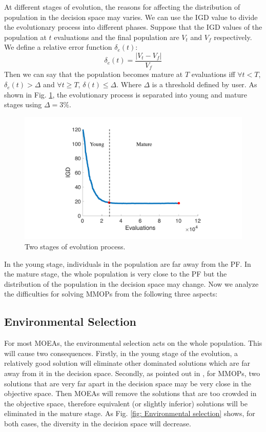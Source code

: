 \documentclass[conference]{IEEEtran}
\begin{document}
At different stages of evolution, the reasons for affecting the distribution of population in the decision space may varies. We can use the IGD\cite{IGD} value to divide the evolutionary process into different phases. Suppose that the IGD values of the population at $t$ evaluations and the final population are $V_t$ and $V_f$ respectively. We define a relative error function $\delta_e(t)$:
$$\delta_e(t)=\frac{|V_t-V_f|}{V_f}$$
Then we can say that the population becomes mature at $T$ evaluations iff $\forall t<T$, $\delta_e(t)>\Delta$ and $\forall t \ge T$, $\delta(t) \leq \Delta$. Where $\Delta$ is a threshold defined by user. As shown in Fig. \ref{fig: Two stages}, the evolutionary process is separated into young and mature stages using $\Delta=3\%$.
\begin{figure}[htbp]
    \centering
    \includegraphics[width=.3\textwidth]{Section3/Stages}
    \caption{Two stages of evolution process.}
    \label{fig: Two stages}
\end{figure}

In the young stage, individuals in the population are far away from the PF. In the mature stage, the whole population is very close to the PF but the distribution of the population in the decision space may change. Now we analyze the difficulties for solving MMOPs from the following three aspects:

\subsection{Environmental Selection}
\label{Impact of environmental selection}
For most MOEAs, the environmental selection acts on the whole population. This will cause two consequences.
Firstly, in the young stage of the evolution, a relatively good solution will eliminate other dominated solutions which are far away from it in the decision space. Secondly, as pointed out in \cite{Liang2016}, for MMOPs, two solutions that are very far apart in the decision space may be very close in the objective space. Then MOEAs will remove the solutions that are too crowded in the objective space, therefore equivalent (or slightly inferior) solutions will be eliminated in the mature stage. As Fig. \ref{fig: Environmental selection} shows, for both cases, the diversity in the decision space will decrease. 
\end{document}
